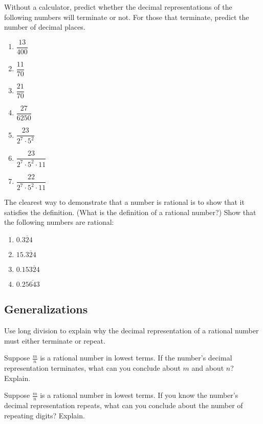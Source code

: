 \documentclass[nooutcomes]{ximera}
\begin{document}
\begin{problem}
Without a calculator, predict whether the decimal representations of the following numbers will terminate or not.  For those that terminate, predict the number of decimal places.  
\begin{enumerate}
\item $\dfrac{13}{400}$
\item $\dfrac{11}{70}$
\item $\dfrac{21}{70}$
\item $\dfrac{27}{6250}$
\item $\dfrac{23}{2^7\cdot 5^2}$
\item $\dfrac{23}{2^7\cdot 5^2\cdot 11}$
\item $\dfrac{22}{2^7\cdot 5^2\cdot 11}$
\end{enumerate}
\end{problem}

\begin{problem}
The clearest way to demonstrate that a number is rational is to show that it satisfies the definition.  (What is the definition of a rational number?)  Show that the following numbers are rational:  
\begin{enumerate}
\item $0.\overline{324}$
\item $15.\overline{324}$
\item $0.15\overline{324}$
\item $0.2\overline{5643}$
\end{enumerate}
\end{problem}

\subsection*{Generalizations}

\begin{problem}
Use long division to explain why the decimal representation of a rational number must either terminate or repeat.
\end{problem}

\begin{problem}
Suppose $\frac{m}{n}$ is a rational number in lowest terms.  If the number's decimal representation terminates, what can you conclude about $m$ and about $n$?  Explain.  
\end{problem}

\begin{problem}
Suppose $\frac{m}{n}$ is a rational number in lowest terms.  If you know the number's decimal representation repeats, what can you conclude about the number of repeating digits?  Explain.  
\end{problem}
\end{document}
